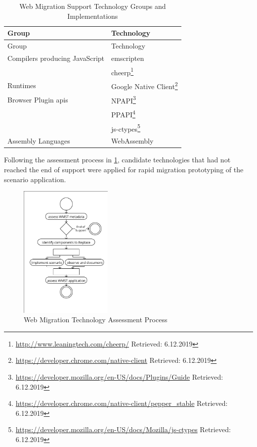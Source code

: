 \vspace{15pt}
\begin{longtable}[]{@{}ll@{}}
\caption[WMST Groups and Implementations]{Web Migration Support Technology Groups and Implementations\label{tbl:wmst}}\tabularnewline
\toprule
Group & Technology\tabularnewline
\midrule
\endfirsthead
\toprule
Group & Technology\tabularnewline
\midrule
\endhead
Compilers producing JavaScript & emscripten \autocite{Zakai2011Emscripten}\tabularnewline
& cheerp\footnote{\url{http://www.leaningtech.com/cheerp/} Retrieved: 6.12.2019}\tabularnewline
Runtimes & Google Native Client\footnote{\url{https://developer.chrome.com/native-client} Retrieved: 6.12.2019}\tabularnewline
Browser Plugin \glspl{api} & NPAPI\footnote{\url{https://developer.mozilla.org/en-US/docs/Plugins/Guide} Retrieved: 6.12.2019}\tabularnewline
& PPAPI\footnote{\url{https://developer.chrome.com/native-client/pepper\_stable} Retrieved: 6.12.2019}\tabularnewline
& js-ctypes\footnote{\url{https://developer.mozilla.org/en-US/docs/Mozilla/js-ctypes} Retrieved: 6.12.2019}\tabularnewline
Assembly Languages & WebAssembly \autocite{W3C2018WebAssembly}\tabularnewline
\bottomrule
\end{longtable}

Following the assessment process in \cref{fig:awsm.rm.rewamp.asessment}, candidate technologies that had not reached the end of support were applied for rapid migration prototyping of the scenario application.
\begin{figure}[h!]
\hypertarget{fig:awsm.rm.rewamp.asessment}{%
\centering
\includegraphics[width=0.4\textwidth]{../figures/rewamp/wmst-assessment.pdf}
\caption[WMST Assessment Process]{Web Migration Technology Assessment Process}\label{fig:awsm.rm.rewamp.asessment}
}
\end{figure}

